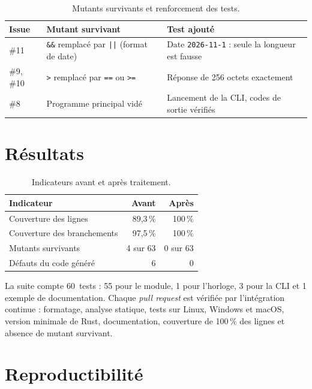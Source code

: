 \documentclass[11pt,a4paper]{article}
\newcommand{\code}[1]{\texttt{\small #1}}
\begin{document}
\begin{table}[H]
\centering
\caption{Mutants survivants et renforcement des tests.}
\label{tab:mutants}
\begin{tabularx}{\linewidth}{@{}l l L@{}}
\toprule
Issue & Mutant survivant & Test ajouté \\
\midrule
\#11 & \code{\&\&} remplacé par \code{||} (format de date) & Date \code{2026-11-1} : seule la longueur est fausse \\
\#9, \#10 & \code{>} remplacé par \code{==} ou \code{>=} & Réponse de 256 octets exactement \\
\#8 & Programme principal vidé & Lancement de la CLI, codes de sortie vérifiés \\
\bottomrule
\end{tabularx}
\end{table}

\section{Résultats}

\begin{table}[H]
\centering
\caption{Indicateurs avant et après traitement.}
\label{tab:resultats}
\begin{tabular}{@{}lrr@{}}
\toprule
Indicateur & Avant & Après \\
\midrule
Couverture des lignes & 89,3\,\% & 100\,\% \\
Couverture des branchements & 97,5\,\% & 100\,\% \\
Mutants survivants & 4 sur 63 & 0 sur 63 \\
Défauts du code généré & 6 & 0 \\
\bottomrule
\end{tabular}
\end{table}

La suite compte 60~tests : 55 pour le module, 1 pour l'horloge, 3 pour la CLI et 1 exemple de
documentation. Chaque \emph{pull request} est vérifiée par l'intégration continue : formatage,
analyse statique, tests sur Linux, Windows et macOS, version minimale de Rust, documentation,
couverture de 100\,\% des lignes et absence de mutant survivant.

\section{Reproductibilité}
\end{document}
